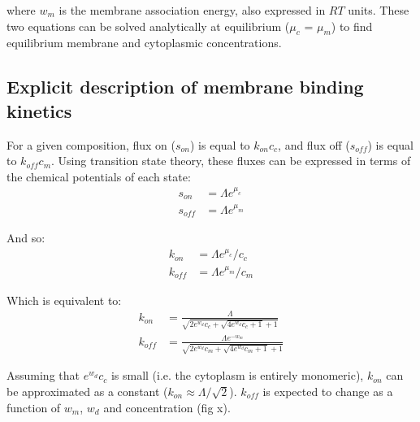 \documentclass[12pt]{"report"}
\begin{document}
where $w_m$ is the membrane association energy, also expressed in $RT$ units. These two equations can be solved analytically at equilibrium ($\mu_c$ = $\mu_m$) to find equilibrium membrane and cytoplasmic concentrations.


\subsection{Explicit description of membrane binding kinetics} 


\begin{center}
\end{center}

For a given composition, flux on ($s_{on}$) is equal to $k_{on} c_c$, and flux off ($s_{off}$) is equal to $k_{off} c_m$. Using transition state theory, these fluxes can be expressed in terms of the chemical potentials of each state:
\begin{align}
s_{on} &= \Lambda e^{\mu_c}\\
s_{off} &= \Lambda e^{\mu_m}
\end{align}

And so:
\begin{align}
k_{on} &= \Lambda e^{\mu_c} / c_c \\
k_{off} &= \Lambda e^{\mu_m} / c_m
\end{align}

Which is equivalent to:
\begin{align}
k_{on} &= \frac{\Lambda}{\sqrt{2 e^{w_d} c_c + \sqrt{4 e^{w_d} c_c + 1} + 1}}\\
k_{off} &= \frac{\Lambda e^{-w_m}}{\sqrt{2 e^{w_d} c_m + \sqrt{4 e^{w_d} c_m + 1} + 1}}
\end{align}

Assuming that $e^{w_d} c_c$ is small (i.e. the cytoplasm is entirely monomeric), $k_{on}$ can be approximated as a constant ($k_{on} \approx \Lambda / \sqrt{2}$). $k_{off}$ is expected to change as a function of $w_m$, $w_d$ and concentration (fig x). 
\end{document}
